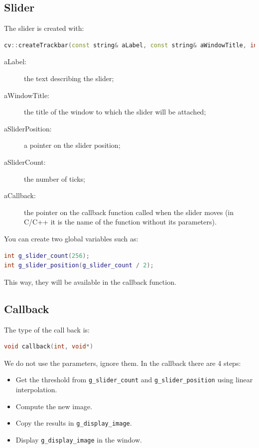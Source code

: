 \documentclass[english,a4paper,12pt,oneside]{article}
\begin{document}
\subsection{Slider}

The slider is created with:
 \begin{lstlisting}[language=c++]
        cv::createTrackbar(const string& aLabel, const string& aWindowTitle, int* aSliderPosition, int aSliderCount, void (*aCallback)(int, void*));
\end{lstlisting}
\begin{description}
 \item[aLabel:] the text describing the slider;
 \item[aWindowTitle:] the title of the window to which the slider will be attached;
 \item[aSliderPosition:] a pointer on the slider position;
 \item[aSliderCount:] the number of ticks;
 \item[aCallback:] the pointer on the callback function called when the slider moves (in C/C++ it is the name of the function without its parameters).
\end{description}

You can create two global variables such as:
\begin{lstlisting}[language=c++]
int g_slider_count(256);
int g_slider_position(g_slider_count / 2);
\end{lstlisting}
This way, they will be available in the callback function. 
 
 \subsection{Callback}
 
The type of the call back is:
\begin{lstlisting}[language=c++]
void callback(int, void*)
\end{lstlisting}
We do not use the parameters, ignore them.
In the callback there are 4 steps:
\begin{itemize}
 \item Get the threshold from \verb+g_slider_count+ and \verb+g_slider_position+ using linear interpolation.
 \item Compute the new image.
 \item Copy the results in \verb+g_display_image+.
 \item Display \verb+g_display_image+ in the window.
\end{itemize}
\end{document}
